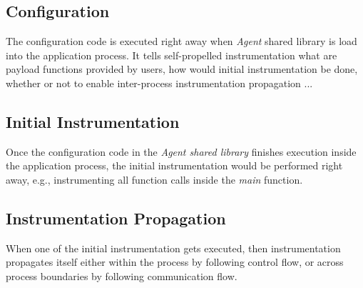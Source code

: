 \subsection{Configuration}
The configuration code is executed right away when {\em Agent} shared library is
load into the application process.
It tells self-propelled instrumentation what are payload functions provided by
users, how would initial instrumentation be done, whether or not to enable
inter-process instrumentation propagation ...

\subsection{Initial Instrumentation}
Once the configuration code in the {\em Agent shared library} finishes execution
inside the application process, the initial instrumentation would be performed
right away, e.g., instrumenting all function calls inside the {\em main}
function.

\subsection{Instrumentation Propagation}
When one of the initial instrumentation gets executed, then instrumentation
propagates itself either within the process by following control flow, or across
process boundaries by following communication flow.

